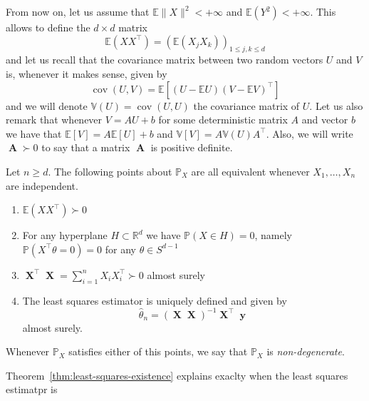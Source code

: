 \documentclass[
	fontsize=11pt, %
	twoside=false, %
	numbers=noenddot, %
]{kaobook}
\DeclareMathOperator{\bA}{\boldsymbol A}
\DeclareMathOperator{\bX}{\boldsymbol X}
\DeclareMathOperator{\by}{\boldsymbol y}
\DeclareMathOperator{\cov}{cov}
\renewcommand{\P}{\mathbb P}
\newcommand{\E}{\mathbb E}
\newcommand{\R}{\mathbb R}
\newcommand{\var}{\mathbb V}
\newcommand{\wh}{\widehat}
\newcommand{\norm}[1]{\|#1\|}
\begin{document}
From now on, let us assume that $\E \norm{X}^2 < +\infty$ and $\E(Y^2) < +\infty$.
This allows to define the $d \times d$ matrix
\begin{equation}
	\E(X X^\top) = (\E(X_j X_k))_{1 \leq j, k \leq d}
\end{equation}
and let us recall that the covariance matrix between two random vectors $U$ and $V$ is, whenever it makes sense, given by
\begin{equation*}
	\cov(U, V) = \E [(U - \E U)(V - \E V)^\top]
\end{equation*}
and we will denote $\var (U) = \cov(U, U)$ the covariance matrix of $U$.
Let us also remark that whenever $V = A U + b$ for some deterministic matrix $A$ and vector $b$ we have that $\E [V] = A \E [U] + b$ and $\var[V] = A \var(U) A^\top$.
Also, we will write $\bA \succ 0$ to say that a matrix $\bA$ is positive definite.
\begin{theorem}
	\label{thm:least-squares-existence}
	Let $n \geq d$. The following points about $\P_X$ are all equivalent whenever $X_1, \ldots, X_n$ are independent.
	\begin{enumerate}
		\item $\E(X X^\top) \succ 0$
		\item For any hyperplane $H \subset \R^d$ we have $\P(X \in H) = 0$, namely $\P(X^\top \theta = 0) = 0$ for any $\theta \in S^{d-1}$
		\item $\bX^\top \bX = \sum_{i=1}^n X_i X_i^\top \succ 0$ almost surely
		\item The least squares estimator is uniquely defined and given by
		\begin{equation*}
			\wh \theta_n = (\bX \bX)^{-1} \bX^\top \by
		\end{equation*}
		almost surely.
	\end{enumerate}
	Whenever $\P_X$ satisfies either of this points, we say that $\P_X$ is \emph{non-degenerate}.
\end{theorem}
Theorem~\ref{thm:least-squares-existence} explains exaclty when the least squares estimatpr is 
\end{document}
